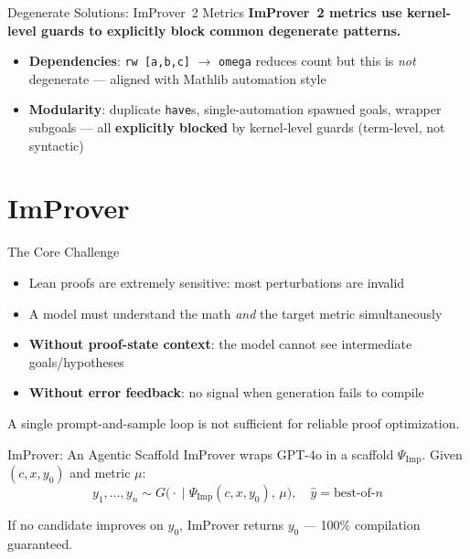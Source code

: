 \documentclass{beamer}
\newcommand{\bad}[1]{\textcolor{improverRed}{\textbf{#1}}}
\begin{document}
\begin{frame}{Degenerate Solutions: ImProver~2 Metrics}
\vspace{0.3em}
\textbf{ImProver~2 metrics use kernel-level guards to explicitly block common degenerate patterns.}
\vspace{0.4em}
\begin{itemize}\setlength{\itemsep}{10pt}
  \item \textbf{Dependencies}: \texttt{rw [a,b,c]} $\to$ \texttt{omega} reduces count but this is \emph{not} degenerate --- aligned with Mathlib automation style
  \item \textbf{Modularity}: duplicate \texttt{have}s, single-automation spawned goals, wrapper subgoals --- all \bad{explicitly blocked} by kernel-level guards (term-level, not syntactic)
\end{itemize}
\end{frame}

\section{ImProver}

\begin{frame}{The Core Challenge}
\vspace{0.8em}
\begin{itemize}\setlength{\itemsep}{10pt}
  \item Lean proofs are extremely sensitive: most perturbations are invalid
  \item A model must understand the math \emph{and} the target metric simultaneously
  \item \textbf{Without proof-state context}: the model cannot see intermediate goals/hypotheses
  \item \textbf{Without error feedback}: no signal when generation fails to compile
\end{itemize}
\vspace{0.8em}
\begin{alertblock}{}
  A single prompt-and-sample loop is not sufficient for reliable proof optimization.
\end{alertblock}
\end{frame}

\begin{frame}{ImProver: An Agentic Scaffold}
\vspace{0.5em}
ImProver wraps GPT-4o in a scaffold $\Psi_{\mathrm{Imp}}$. Given $(c, x, y_0)$ and metric $\mu$:
\[
  y_1,\dots,y_n \sim G\bigl(\cdot \;\big|\; \Psi_{\mathrm{Imp}}(c, x, y_0),\, \mu\bigr), \quad \hat{y} = \text{best-of-}n
\]
\vspace{0.6em}
\begin{exampleblock}{}
  If no candidate improves on $y_0$, ImProver returns $y_0$ --- 100\% compilation guaranteed.
\end{exampleblock}
\end{frame}
\end{document}
